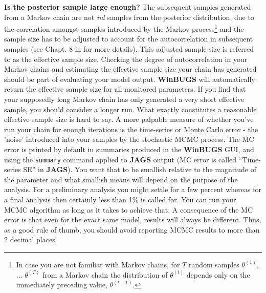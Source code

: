 {\bf Is the posterior sample large enough?}  The subsequent samples
generated from a Markov chain are not {\it iid} samples from the
posterior distribution, due to the correlation amongst samples
introduced by the Markov process\footnote{In case you are not familiar with Markov chains, for
  $T$ random samples $\theta^ {(1)}$, ... $\theta^{(T)}$ from a Markov chain
  the distribution of $\theta^{(t)}$ depends only on the immediately preceding
  value, $\theta^{(t-1)}$.} and the sample size has to be
adjusted to account for the autocorrelation in subsequent samples (see
Chapt. 8 in \citet{robert_casella:2010} for more details). This
adjusted sample size is referred to as the effective sample
size. Checking the degree of autocorrelation in your Markov chains and
estimating the effective sample size your chain has generated should
be part of evaluating your model output. {\bf WinBUGS} will
automatically return the effective sample size for all monitored
parameters. If you find that your supposedly long Markov chain has
only generated a very short effective sample, you should consider a
longer run. What exactly constitutes a reasonable effective sample
size is hard to say. A more palpable measure of whether you've run
your chain for enough iterations is the time-series or Monte Carlo
error - the 'noise' introduced into your samples by the stochastic
MCMC process. The MC error  is printed by
default in summaries produced in the {\bf WinBUGS} GUI, and using the
\mbox{\tt summary} command applied to {\bf JAGS} output (MC error is called
``Time-series SE'' in {\bf JAGS}). You want that to be
smallish relative to the magnitude of the parameter and what smallish means will
depend on the purpose of the analysis. For a preliminary analysis you
might settle for a few percent whereas for a final analysis then
certainly less than 1\% is called for. You can run your MCMC
algorithm as long as it takes to achieve that. A consequence of the MC error is that
even for the exact same model, results will always be different. Thus,
as a good rule of thumb, you should avoid reporting MCMC results to more
than 2 decimal places!

